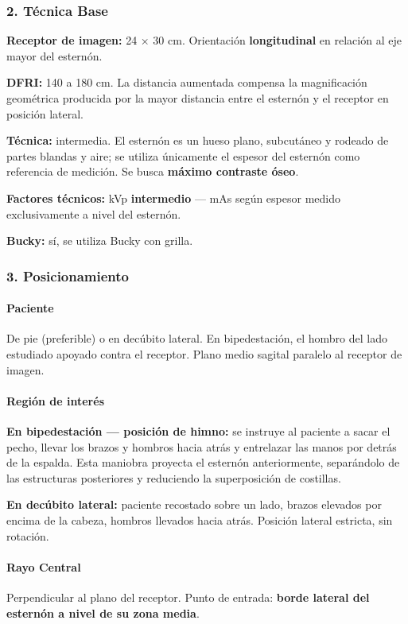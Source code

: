 	\subsubsection*{2. Técnica Base}
	
	\textbf{Receptor de imagen:} 24 × 30 cm. Orientación \textbf{longitudinal} en relación al eje mayor del esternón.
	
	\textbf{DFRI:} 140 a 180 cm. La distancia aumentada compensa la magnificación geométrica producida por la mayor distancia entre el esternón y el receptor en posición lateral.
	
	\textbf{Técnica:} intermedia. El esternón es un hueso plano, subcutáneo y rodeado de partes blandas y aire; se utiliza únicamente el espesor del esternón como referencia de medición. Se busca \textbf{máximo contraste óseo}.
	
	\textbf{Factores técnicos:} kVp \textbf{intermedio} --- mAs según espesor medido exclusivamente a nivel del esternón.
	
	\textbf{Bucky:} sí, se utiliza Bucky con grilla.
	
	\subsubsection*{3. Posicionamiento}
	
	\paragraph{Paciente}
	De pie (preferible) o en decúbito lateral. En bipedestación, el hombro del lado estudiado apoyado contra el receptor. Plano medio sagital paralelo al receptor de imagen.
	
	\paragraph{Región de interés}
	\textbf{En bipedestación --- posición de himno:} se instruye al paciente a sacar el pecho, llevar los brazos y hombros hacia atrás y entrelazar las manos por detrás de la espalda. Esta maniobra proyecta el esternón anteriormente, separándolo de las estructuras posteriores y reduciendo la superposición de costillas.
	
	\textbf{En decúbito lateral:} paciente recostado sobre un lado, brazos elevados por encima de la cabeza, hombros llevados hacia atrás. Posición lateral estricta, sin rotación.
	
	\paragraph{Rayo Central}
	Perpendicular al plano del receptor. Punto de entrada: \textbf{borde lateral del esternón a nivel de su zona media}.
	
